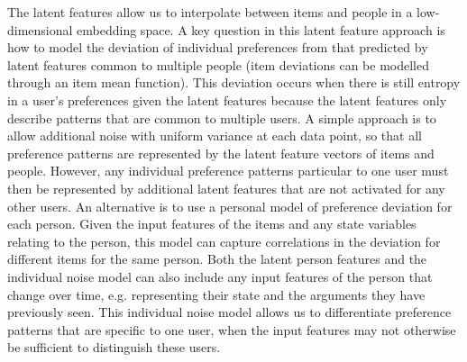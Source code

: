The latent features allow us to interpolate between items and people in a low-dimensional embedding space. 
A key question in this latent feature approach is how to model the deviation of individual 
preferences from that predicted by latent features common to multiple people (item deviations
can be modelled through an item mean function).
This deviation occurs when there is still entropy in a user's preferences given the latent features
because the latent features only describe patterns that are common to multiple users.
A simple approach is to allow additional noise with uniform variance at each data point, 
so that all preference patterns are represented by the latent feature vectors of items and people.
However, any individual preference patterns particular to one user must then be represented by additional
latent features that are not activated for any other users. 
An alternative is to use a personal model of preference deviation for each person. 
Given the input features of the items and any state variables relating to the person, 
this model can capture correlations in the deviation for different items for the same person. 
Both the latent person features and the individual noise model can also include any input features of 
the person that change over time, e.g. representing their state and the arguments they have 
previously seen. 
This individual noise model allows us to differentiate preference patterns that are specific to 
one user, when the input features may not otherwise be sufficient to distinguish these users. 
